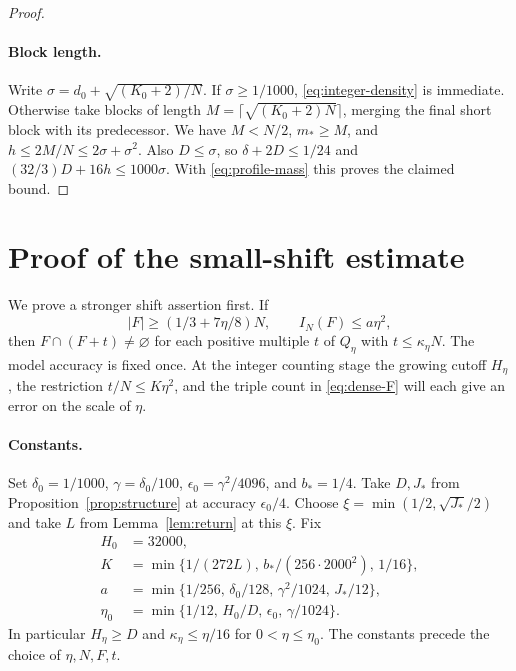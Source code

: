 \documentclass[11pt,reqno]{amsart}
\numberwithin{equation}{section}
\begin{document}
\begin{proof}
\paragraph{Block length.}
Write \(\sigma=d_0+\sqrt{(K_0+2)/N}\).
If \(\sigma\ge1/1000\), \eqref{eq:integer-density} is immediate.
Otherwise take blocks of length \(M=\lceil\sqrt{(K_0+2)N}\rceil\),
merging the final short block with its predecessor. We have
\(M<N/2\), \(m_*\ge M\), and \(h\le2M/N\le2\sigma+\sigma^2\).
Also \(D\le\sigma\), so \(\delta+2D\le1/24\) and
\((32/3)D+16h\le1000\sigma\). With \eqref{eq:profile-mass}
this proves the claimed bound.
\end{proof}

\section{Proof of the small-shift estimate}\label{sec:proof-shifts}

We prove a stronger shift assertion first. If
\begin{equation}\label{eq:dense-F}
 |F|\ge (1/3+7\eta/8)N,\qquad I_N(F)\le a\eta^2 ,
\end{equation}
then \(F\cap(F+t)\ne\varnothing\) for each positive multiple \(t\)
of \(Q_\eta\) with \(t\le\kappa_\eta N\).
The model accuracy is fixed once. At the integer counting stage
the growing cutoff \(H_\eta\), the restriction \(t/N\le K\eta^2\),
and the triple count in \eqref{eq:dense-F} will each give an error
on the scale of \(\eta\).

\paragraph{Constants.}
Set \(\delta_0=1/1000\), \(\gamma=\delta_0/100\),
\(\epsilon_0=\gamma^2/4096\), and \(b_*=1/4\).
Take \(D,J_*\) from Proposition~\ref{prop:structure} at
accuracy \(\epsilon_0/4\).
Choose \(\xi=\min(1/2,\sqrt{J_*}/2)\) and take \(L\)
from Lemma~\ref{lem:return} at this \(\xi\).
Fix
\[
 \begin{aligned}
 H_0 &= 32000,\\
 K &= \min\{1/(272L),\, b_* /(256\cdot2000^2),\,1/16\},\\
 a &= \min\{1/256,\,\delta_0/128,\,\gamma^2/1024,\,J_*/12\},\\
 \eta_0 &= \min\{1/12,\,H_0/D,\,\epsilon_0,\,\gamma/1024\}.
 \end{aligned}
\]
In particular \(H_\eta\ge D\) and \(\kappa_\eta\le\eta/16\)
for \(0<\eta\le\eta_0\). The constants precede the choice
of \(\eta,N,F,t\).
\end{document}
